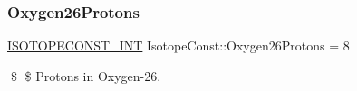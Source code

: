 \subsubsection{\texorpdfstring{Oxygen26\+Protons}{Oxygen26Protons}}
{\footnotesize\ttfamily \mbox{\hyperlink{group___isotope_const-_macros_ga5f18360b3e99483a35c32d789e62621c}{I\+S\+O\+T\+O\+P\+E\+C\+O\+N\+S\+T\+\_\+\+I\+NT}} Isotope\+Const\+::\+Oxygen26\+Protons = 8}

\$ \$ Protons in Oxygen-\/26. 